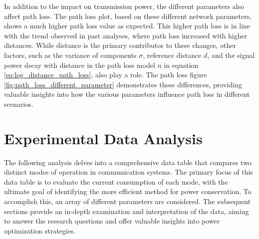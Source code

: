 In addition to the impact on transmission power, the different parameters also affect path loss. The path loss plot, based on these different network parameters, shows a much higher path loss value as expected. This higher path loss is in line with the trend observed in past analyses, where path loss increased with higher distances. While distance is the primary contributor to these changes, other factors, such as the variance of components $\sigma$, reference distance $d$, and the signal power decay with distance in the path loss model $n$ in equation \ref{eq:log_distance_path_loss}, also play a role. The path loss figure \ref{fig:path_loss_different_parameter} demonstrates these differences, providing valuable insights into how the various parameters influence path loss in different scenarios.


\section{Experimental Data Analysis}

The following analysis delves into a comprehensive data table that compares two distinct modes of operation in communication systems. The primary focus of this data table is to evaluate the current consumption of each mode, with the ultimate goal of identifying the more efficient method for power conservation. To accomplish this, an array of different parameters are considered. The subsequent sections provide an in-depth examination and interpretation of the data, aiming to answer the research questions and offer valuable insights into power optimization strategies.


